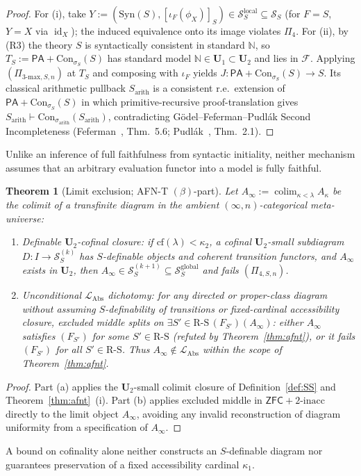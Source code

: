 \documentclass[11pt]{article}
\theoremstyle{plain}
\newtheorem{theorem}{Theorem}[section]
\theoremstyle{definition}
\newcommand{\RS}{\mathrm{R\text{-}S}}
\newcommand{\cS}{\mathcal{S}}
\newcommand{\cF}{\mathcal{F}}
\newcommand{\LAbs}{\mathcal{L}_{\mathrm{Abs}}}
\newcommand{\Syn}{\mathrm{Syn}}
\newcommand{\Con}{\mathrm{Con}}
\newcommand{\PA}{\mathsf{PA}}
\newcommand{\ZFC}{\mathsf{ZFC}}
\DeclareMathOperator{\colim}{colim}
\DeclareMathOperator{\id}{id}
\begin{document}
\begin{proof}
For (i), take $Y := (\Syn(S), [\iota_F(\phi_X)]_S) \in \cS_S^{\mathrm{local}} \subseteq \cS_S$ (for $F = S$, $Y = X$ via $\id_X$); the induced equivalence onto its image violates $\Pi_4$. For (ii), by (R3) the theory $S$ is syntactically consistent in standard $\mathbb{N}$, so $T_S := \PA + \Con_{\sigma_S}(S)$ has standard model $\mathbb{N} \in \mathbf{U}_1 \subset \mathbf{U}_2$ and lies in $\cF$. Applying $(\Pi_{3\text{-max}, S, n})$ at $T_S$ and composing with $\iota_F$ yields $J : \PA + \Con_{\sigma_S}(S) \to S$. Its classical arithmetic pullback $S_{\mathrm{arith}}$ is a consistent r.e.\ extension of $\PA + \Con_{\sigma_S}(S)$ in which primitive-recursive proof-translation gives $S_{\mathrm{arith}} \vdash \Con_{\sigma_{\mathrm{arith}}}(S_{\mathrm{arith}})$, contradicting G\"odel--Feferman--Pudl\'ak Second Incompleteness (Feferman~\cite{Feferman1960}, Thm.~5.6; Pudl\'ak~\cite{Pudlak1985}, Thm.~2.1).
\end{proof}
Unlike an inference of full faithfulness from syntactic initiality, neither mechanism assumes that an arbitrary evaluation functor into a model is fully faithful.

\begin{theorem}[Limit exclusion; AFN-T $(\beta)$-part]\label{thm:afnt-beta}
Let $A_\infty := \colim_{\kappa < \lambda} A_\kappa$ be the colimit of a transfinite diagram in the ambient $(\infty, n)$-categorical meta-universe:
\begin{enumerate}[nosep,label=(\alph*)]
\item \emph{Definable $\mathbf{U}_2$-cofinal closure}: if $\mathrm{cf}(\lambda) < \kappa_2$, a cofinal $\mathbf{U}_2$-small subdiagram $D : I \to \cS_S^{(k)}$ has $S$-definable objects and coherent transition functors, and $A_\infty$ exists in $\mathbf{U}_2$, then $A_\infty \in \cS_S^{(k+1)} \subseteq \cS_S^{\mathrm{global}}$ and fails $(\Pi_{4, S, n})$.
\item \emph{Unconditional $\LAbs$ dichotomy}: for any directed or proper-class diagram without assuming $S$-definability of transitions or fixed-cardinal accessibility closure, excluded middle splits on $\exists S' \in \RS\,(F_{S'})(A_\infty)$: either $A_\infty$ satisfies $(F_{S'})$ for some $S' \in \RS$ (refuted by Theorem~\ref{thm:afnt}), or it fails $(F_{S'})$ for all $S' \in \RS$. Thus $A_\infty \notin \LAbs$ within the scope of Theorem~\ref{thm:afnt}.
\end{enumerate}
\end{theorem}
\begin{proof}
Part (a) applies the $\mathbf{U}_2$-small colimit closure of Definition~\ref{def:SS} and Theorem~\ref{thm:afnt}~(i). Part (b) applies excluded middle in $\ZFC + 2\text{-inacc}$ directly to the limit object $A_\infty$, avoiding any invalid reconstruction of diagram uniformity from a specification of $A_\infty$.
\end{proof}
A bound on cofinality alone neither constructs an $S$-definable diagram nor guarantees preservation of a fixed accessibility cardinal $\kappa_1$.
\end{document}
